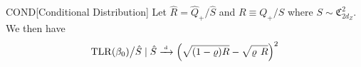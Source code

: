 \begin{lemmap}{COND}[Conditional Distribution]\label{lem:cond}
    Let \(\hat R = \hat Q_+ / \hat S\) and \(R\equiv Q_+ / S\) where \(S\sim \mathfrak{C}^2_{2d_Z}\). We then have
    \begin{align}
        \mathrm{TLR}(\beta_0) \big / \hat S \mid \hat S \xrightarrow{{\scriptscriptstyle \mathrm{\;d\;}}} \left(\sqrt{(1-\varrho) R}-\sqrt{\varrho \phantom{)} R}\right)^2
    \end{align}
\end{lemmap}
